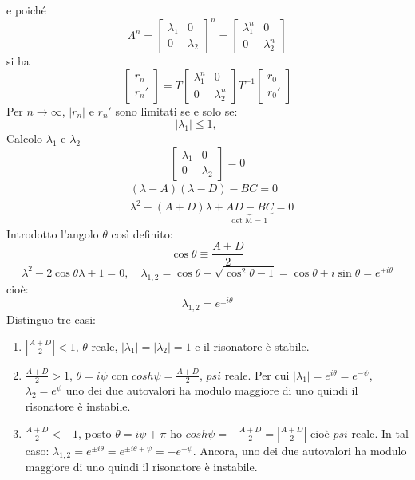 \documentclass{book}
\def \l {\lambda}
\theoremstyle{remark}
\begin{document}
e poiché
\begin{equation*}
\Lambda^n = \begin{bmatrix}
\l_1	&	0\\
0	&	\l_2
\end{bmatrix}^n = \begin{bmatrix}
\l_1^n	&	0\\
0	&	\l_2^n
\end{bmatrix}
\end{equation*}
si ha
\begin{equation*}
\begin{bmatrix}
r_n\\
r_n'
\end{bmatrix} =
T\begin{bmatrix}
\l_1^n	&	0\\
0	&	\l_2^n
\end{bmatrix}
T^{-1}\begin{bmatrix}
r_0\\
r_0'
\end{bmatrix}
\end{equation*}
Per $n\rightarrow\infty$, $|r_n|$ e $r_n'$ sono limitati se e solo se:
\begin{equation*}
|\l_1| \leq 1, \qquad 
\end{equation*}
Calcolo $\l_1$ e $\l_2$
\begin{equation*}
\begin{bmatrix}
\l_1	&	0\\
0	&	\l_2
\end{bmatrix} = 0
\end{equation*}
\begin{align*}
&(\l-A)(\l-D)-BC = 0\\
&\l^2-(A+D)\l+\underbrace{AD-BC}_\text{det M = 1} = 0
\end{align*}
Introdotto l'angolo $\theta$ così definito:
\begin{equation*}
\cos \theta \equiv \frac{A+D}{2}
\end{equation*}
\begin{equation*}
\l^2 - 2\cos\theta\l + 1 = 0, \quad \l_{1,2} = \cos\theta \pm \sqrt{\cos^2\theta -1} = \cos\theta \pm i\sin\theta = e^{\pm i\theta}
\end{equation*}
cioè:
\begin{equation*}
\l_{1,2} = e^{\pm i\theta}
\end{equation*}
Distinguo tre casi:
\begin{enumerate}
\item $\left|\frac{A+D}{2}\right|<1$, $\theta$ reale, $|\l_1|=|\l_2|=1$ e il risonatore è stabile.
\item $\frac{A+D}{2}>1$, $\theta = i\psi$ con $cosh \psi=\frac{A+D}{2}$, $psi$ reale. Per cui $|\l_1|= e^{i\theta}=e^{-\psi}$, $\l_2=e^\psi$ uno dei due autovalori ha modulo maggiore di uno quindi il risonatore è instabile.
\item $\frac{A+D}{2}<-1$, posto $\theta=i\psi+\pi$ ho $cosh \psi=-\frac{A+D}{2} = \left|\frac{A+D}{2}\right|$ cioè $psi$ reale. In tal caso: $\l_{1,2}= e^{\pm i\theta}=e^{\pm i\theta \mp \psi} = -e^{\mp\psi}$. Ancora, uno dei due autovalori ha modulo maggiore di uno quindi il risonatore è instabile.
\end{enumerate}
\end{document}

